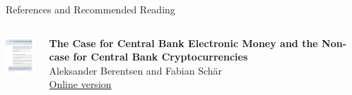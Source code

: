 \documentclass[handout]{beamer}
\begin{document}
\begin{frame}{References and Recommended Reading}
		\begin{columns}[T]
			\begin{column}{0.1\textwidth}
					\includegraphics[width = 1.7cm, frame]{../assets/images/berentsen_schaer}
			\end{column} %
			\begin{column}{0.8\textwidth}
				\textbf{The Case for Central Bank Electronic Money and the Non-case for Central Bank Cryptocurrencies} \\ 
				Aleksander Berentsen and Fabian Schär \\
				\link \href{https://research.stlouisfed.org/publications/review/2018/02/13/the-case-for-central-bank-electronic-money-and-the-non-case-for-central-bank-cryptocurrencies}{Online version}
			\end{column}
		\end{columns}
	
\end{frame}
\end{document}
